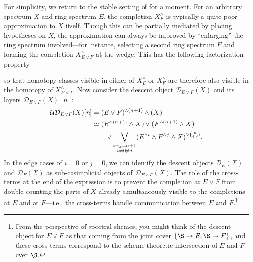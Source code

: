 For simplicity, we return to the stable setting of  for a moment.  For an arbitrary spectrum \(X\) and ring spectrum \(E\), the completion \(X^\wedge_E\) is typically a quite poor approximation to \(X\) itself.  Though this can be partially mediated by placing hypotheses on \(X\), the approximation can always be improved by ``enlarging'' the ring spectrum involved---for instance, selecting a second ring spectrum \(F\) and forming the completion \(X^\wedge_{E \vee F}\) at the wedge.  This has the following factorization property
\begin{center}
\end{center}
so that homotopy classes visible in either of \(X^\wedge_E\) or \(X^\wedge_F\) are therefore also visible in the homotopy of \(X^\wedge_{E \vee F}\).  Now consider the descent object \(\mathcal D_{E \vee F}(X)\) and its layers \(\mathcal D_{E \vee F}(X)[n]\):
\begin{align*}
\mathcal{UD}_{E \vee F}(X)[n] & = (E \vee F)^{\wedge (n+1)} \wedge (X) \\
& \simeq (E^{\wedge (n+1)} \wedge X) \vee (F^{\wedge (n+1)} \wedge X) \\
& \quad \quad \vee \bigvee_{\substack{i+j=n+1 \\ i \ne 0 \ne j}} (E^{\wedge i} \wedge F^{\wedge j} \wedge X)^{\vee \binom{n}{i,j}}.
\end{align*}
In the edge cases of \(i = 0\) or \(j = 0\), we can identify the descent objects \(\mathcal D_E(X)\) and \(\mathcal D_F(X)\) as sub-cosimplicial objects of \(\mathcal D_{E \vee F}(X)\).  The role of the cross-terms at the end of the expression is to prevent the completion at \(E \vee F\) from double-counting the parts of \(X\) already simultaneously visible to the completions at \(E\) and at \(F\)---i.e., the cross-terms handle communication between \(E\) and \(F\).\footnote{From the perspective of spectral shemes, you might think of the descent object for \(E \vee F\) as that coming from the joint cover \(\{\S \to E, \S \to F\}\), and these cross-terms correspond to the scheme-theoretic intersection of \(E\) and \(F\) over \(\S\).}

